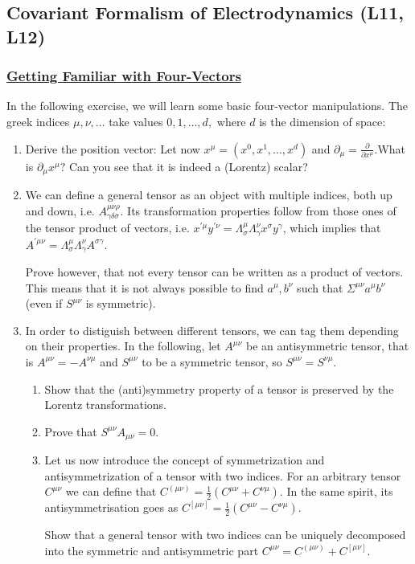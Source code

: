
\subsection{Covariant Formalism of Electrodynamics (\textbf{L11, L12})}

\subsubsection{\hyperref[Getting Familiar with Four-Vectors]{Getting Familiar with Four-Vectors}}

In the following exercise, we will learn some basic four-vector manipulations. The greek indices $\mu, \nu, \ldots$ take values $0,1, \ldots, d,$ where $d$ is the dimension of space:

\begin{enumerate}
	\item Derive the position vector: Let now $x^{\mu}=\left(x^{0}, x^{1}, \ldots, x^{d}\right)$ and $\partial_{\mu}=\frac{\partial}{\partial x^{\mu}}$.What is $\partial_{\mu} x^{\mu} ?$ Can you see that it is indeed a (Lorentz) scalar?
	\item We can define a general tensor as an object with multiple indices, both up and down, i.e. $A_{\gamma \delta \sigma}^{\mu \nu \rho} .$ Its transformation properties follow from those ones of the tensor product of vectors, i.e. $x^{\prime \mu} y^{\prime \nu}=\Lambda_{\sigma}^{\mu} \Lambda_{\gamma}^{\nu} x^{\sigma} y^{\gamma}$, which implies that $A^{\prime \mu \nu}=\Lambda_{\sigma}^{\mu} \Lambda_{\gamma}^{\nu} A^{\sigma \gamma}$.
	
	Prove however, that not every tensor can be written as a product of vectors. This means that it is not always possible to find $a^{\mu}, b^{\nu}$ such that $\Sigma^{\mu \nu} a^{\mu} b^{\nu}$ (even if $S^{\mu \nu}$ is symmetric).
	\item In order to distiguish between different tensors, we can tag them depending on their properties. In the following, let $A^{\mu \nu}$ be an antisymmetric tensor, that is $A^{\mu \nu}=-A^{\nu \mu}$ and $S^{\mu \nu}$ to be a symmetric tensor, so $S^{\mu \nu}=S^{\nu \mu}$.
	
	\begin{enumerate}
		\item Show that the (anti)symmetry property of a tensor is preserved by the Lorentz transformations.
		\item Prove that $S^{\mu \nu} A_{\mu \nu}=0$.
		\item Let us now introduce the concept of symmetrization and antisymmetrization of a tensor with two indices. For an arbitrary tensor $C^{\mu \nu}$ we can define that $C^{(\mu \nu)}=\frac{1}{2}\left(C^{\mu \nu}+C^{\nu \mu}\right)$. In the same spirit, its antisymmetrisation goes as $C^{[\mu \nu]}=\frac{1}{2}\left(C^{\mu \nu}-C^{\nu \mu}\right)$.
		
		Show that a general tensor with two indices can be uniquely decomposed into the symmetric and antisymmetric part $C^{\mu \nu}=C^{(\mu \nu)}+C^{[\mu \nu]}$.
	\end{enumerate}
\end{enumerate}

